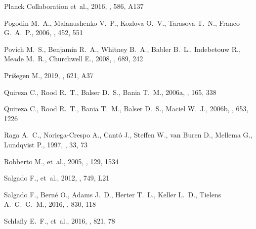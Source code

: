 \documentclass[useAMS, usenatbib, a4paper]{mnras}
\begin{document}
\begin{thebibliography}{}
{Planck Collaboration} et~al., 2016, \aap, 586, A137

{Pogodin} M.~A.,  {Malanushenko} V.~P.,  {Kozlova} O.~V.,  {Tarasova} T.~N.,
  {Franco} G.~A.~P.,  2006, \aap, 452, 551

{Povich} M.~S.,  {Benjamin} R.~A.,  {Whitney} B.~A.,  {Babler} B.~L.,
  {Indebetouw} R.,  {Meade} M.~R.,   {Churchwell} E.,  2008, \apj, 689, 242

{Prišegen} M.,  2019, \aap, 621, A37

{Quireza} C.,  {Rood} R.~T.,  {Balser} D.~S.,   {Bania} T.~M.,  2006a, \apjs,
  165, 338

{Quireza} C.,  {Rood} R.~T.,  {Bania} T.~M.,  {Balser} D.~S.,   {Maciel} W.~J.,
   2006b, \apj, 653, 1226

{Raga} A.~C.,  {Noriega-Crespo} A.,  {Cantó} J.,  {Steffen} W.,  {van Buren}
  D.,  {Mellema} G.,   {Lundqvist} P.,  1997, \rmxaa, 33, 73

{Robberto} M.,  et~al., 2005, \aj, 129, 1534

{Salgado} F.,  et~al., 2012, \apjl, 749, L21

{Salgado} F.,  {Berné} O.,  {Adams} J.~D.,  {Herter} T.~L.,  {Keller} L.~D.,
  {Tielens} A.~G.~G.~M.,  2016, \apj, 830, 118

{Schlafly} E.~F.,  et~al., 2016, \apj, 821, 78


\end{thebibliography}
\end{document}
